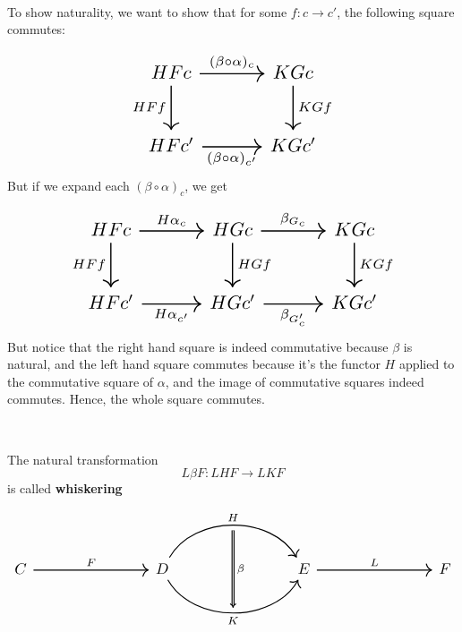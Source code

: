 \documentclass{article}
\begin{document}
\begin{customproof}
\

To show naturality, we want to show that for some $f: c \to c'$, the following square commutes: 

\[\begin{tikzcd}[
    column sep=huge, 
    row sep=huge, 
    nodes={scale=1.5}, 
    every arrow/.append style={line width=1pt} 
]
    HFc & KGc\\
    HFc'& KGc'
    \arrow[from=1-1, to=1-2, "(\beta \circ \alpha)_c"]
    \arrow[from=1-1, to=2-1, "HFf"']
    \arrow[from=2-1, to=2-2, "(\beta \circ \alpha)_{c'}"']
    \arrow[from=1-2, to=2-2, "KGf"]
\end{tikzcd}\]But if we expand each $(\beta\circ\alpha)_c$, we get 

\[\begin{tikzcd}[
    column sep=huge, 
    row sep=huge, 
    nodes={scale=1.5}, 
    every arrow/.append style={line width=1pt} 
]
    HFc & HGc & KGc\\
    HFc'& HGc' & KGc'
    \arrow[from=1-1, to=1-2, "H\alpha_c"]
    \arrow[from=1-1, to=2-1, "HFf"']
    \arrow[from=2-1, to=2-2, "H\alpha_{c'}"']
    \arrow[from=1-2, to=2-2, "HGf"]
    \arrow[from=1-2, to=1-3, "\beta_{G_c}"]
    \arrow[from=1-3, to=2-3, "KGf"]
    \arrow[from=2-2, to=2-3, "\beta_{G_c'}"']
\end{tikzcd}\]But notice that the right hand square is indeed commutative because $\beta$ is natural, and the left hand square commutes because it's the functor $H$ applied to the commutative square of $\alpha$, and the image of commutative squares indeed commutes. Hence, the whole square commutes.
\end{customproof}

\begin{definition}[Whiskering]
\

The natural transformation $$L\beta F: LHF \to LKF$$is called \textbf{whiskering} 

\[
\begin{tikzcd}[
    column sep=4cm, 
    row sep=huge, 
    nodes={scale=1.5}, 
    every arrow/.append style={line width=1pt} 
]
    C & D & E & F
    \arrow[from=1-1, to=1-2, "F"]
    \arrow[from=1-3, to=1-4, "L"]
    \arrow[from=1-2, to=1-3, bend left = 60, "H"{name=F}]
    \arrow[from=1-2, to=1-3, bend right = 60, "K"'{name=H}]
    \arrow[Rightarrow, from=F, to=H, "\beta", shorten <= 5pt, shorten >= 5pt]
\end{tikzcd}
\]
\end{definition}
\end{document}

